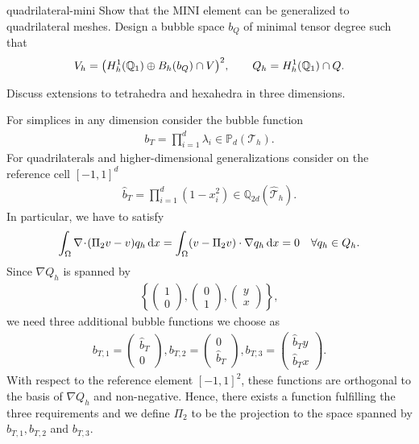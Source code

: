 \begin{Problem}{quadrilateral-mini}
  Show that the MINI element can be generalized to quadrilateral
  meshes. Design a bubble space $b_Q$ of minimal tensor degree such that
  \begin{gather*}
    V_h = \bigl(H^1_h(\mathbb Q_1) \oplus B_h(b_Q) \cap V\bigr)^2,
    \qquad
    Q_h = H^1_h(\mathbb Q_1) \cap Q.
  \end{gather*}

  Discuss extensions to tetrahedra and hexahedra in three dimensions.
\begin{solution}
  For simplices in any dimension consider the bubble function
  \begin{align*}
    b_T=\prod_{i=1}^d\lambda_i\in \mathbb{P}_d(\mathcal{T}_h).
  \end{align*}
  For quadrilaterals and higher-dimensional generalizations consider
  on the reference cell $[-1,1]^d$
  \begin{align*}
    \hat{b}_T=\prod_{i=1}^d(1-x_i^2)\in \mathbb{Q}_{2d}(\hat{\mathcal{T}}_h).
  \end{align*}
  In particular, we have to satisfy
  \begin{gather*}
    \int_\Omega \nabla\!\cdot\!(\Pi_2 v-v) q_h \,\mathrm{d} x
    = \int_\Omega (v-\Pi_2v)\cdot\nabla q_h\,\mathrm{d} x
    = 0 \quad \forall q_h\in Q_h.
  \end{gather*}
  Since $\nabla Q_h$ is spanned by
  \begin{align*}
    \left\{
      \begin{pmatrix} 1 \\0 \end{pmatrix},
      \begin{pmatrix} 0 \\1 \end{pmatrix},
      \begin{pmatrix} y \\x \end{pmatrix}
    \right\},
  \end{align*}
  we need three additional bubble functions we choose as
  \begin{align*}
    b_{T,1}= \begin{pmatrix} \hat{b}_T   \\ 0         \end{pmatrix},
    b_{T,2}= \begin{pmatrix}         0   \\ \hat{b}_T \end{pmatrix},
    b_{T,3}= \begin{pmatrix} \hat{b}_T y \\ \hat{b}_T x \end{pmatrix}.
  \end{align*}
  With respect to the reference element $[-1,1]^2$, these functions are orthogonal
  to the basis of $\nabla Q_h$ and non-negative. Hence, there exists a function
  fulfilling the three requirements and we define $\Pi_2$ to be the projection to the
  space spanned by $b_{T,1}, b_{T,2}$ and $b_{T,3}$.
\end{solution}
\end{Problem}

